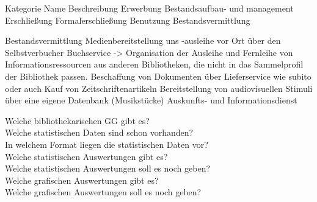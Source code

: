 Kategorie           Name                                Beschreibung
Erwerbung           Bestandsaufbau- und management
Erschließung        Formalerschließung
Benutzung           Bestandsvermittlung


Bestandsvermittlung Medienbereitstellung uns -ausleihe vor Ort über den Selbstverbucher
Buchservice -> Organisation der Ausleihe und Fernleihe von Informationsressourcen aus anderen Bibliotheken, die nicht in das Sammelprofil der Bibliothek passen. 
    Beschaffung von Dokumenten über Lieferservice wie subito
    oder auch Kauf von Zeitschriftenartikeln
Bereitstellung von audiovisuellen Stimuli über eine eigene Datenbank (Musikstücke)
Auskunfts- und Informationsdienst



Welche bibliothekarischen GG gibt es?\\
Welche statistischen Daten sind schon vorhanden?\\
In welchem Format liegen die statistischen Daten vor?\\
Welche statistischen Auswertungen gibt es?\\
Welche statistischen Auswertungen soll es noch geben?\\
Welche grafischen Auswertungen gibt es?\\
Welche grafischen Auswertungen soll es noch geben?

\clearpage

